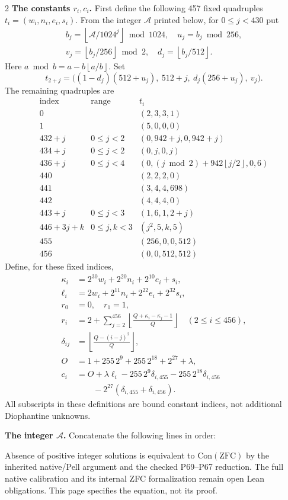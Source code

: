 \documentclass[10pt]{article}
\let\bigsum\sum
\renewcommand{\sum}{\bigsum\nolimits}
\newcommand{\fl}[1]{\left\lfloor #1\right\rfloor}
\begin{document}
\begin{multicols}{2}
\textbf{The constants $r_i,c_i$.}
First define the following 457 fixed quadruples
$t_i=(w_i,n_i,e_i,s_i)$.
From the integer $\mathcal A$ printed below, for $0\le j<430$ put
\[
\begin{gathered}
b_j=\fl{\mathcal A/1024^j}\bmod1024,\quad u_j=b_j\bmod256,\\
v_j=\fl{b_j/256}\bmod2,\quad d_j=\fl{b_j/512}.
\end{gathered}
\]
Here $a\bmod b=a-b\fl{a/b}$. Set
\[
t_{2+j}=\bigl((1-d_j)(512+u_j),\ 512+j,\ d_j(256+u_j),\ v_j\bigr).
\]
The remaining quadruples are
\[
\begin{array}{c|c|l}
\text{index}&\text{range}&t_i\\\hline
0&& (2,3,3,1)\\
1&& (5,0,0,0)\\
432+j&0\le j<2&(0,942+j,0,942+j)\\
434+j&0\le j<2&(0,j,0,j)\\
436+j&0\le j<4&(0,(j\bmod2)+942\fl{j/2},0,6)\\
440&&(2,2,2,0)\\
441&&(3,4,4,698)\\
442&&(4,4,4,0)\\
443+j&0\le j<3&(1,6,1,2+j)\\
446+3j+k&0\le j,k<3&(j^2,5,k,5)\\
455&&(256,0,0,512)\\
456&&(0,0,512,512)
\end{array}
\]
Define, for these fixed indices,
\begin{align*}
\kappa_i&=2^{30}w_i+2^{20}n_i+2^{10}e_i+s_i,\\
\ell_i&=2w_i+2^{11}n_i+2^{22}e_i+2^{32}s_i,\\
r_0&=0,\quad r_1=1,\\
r_i&=2+\sum_{j=2}^{456}\fl{\frac{Q+\kappa_i-\kappa_j-1}{Q}}
 \quad(2\le i\le456),\\
\delta_{ij}&=\fl{\frac{Q-(i-j)^2}{Q}},\\
O&=1+255\,2^9+255\,2^{18}+2^{27}+\lambda,\\
c_i&=O+\lambda\ell_i-255\,2^9\delta_{i,455}-255\,2^{18}\delta_{i,456}\\
 &\qquad -2^{27}(\delta_{i,455}+\delta_{i,456}).
\end{align*}
All subscripts in these definitions are bound constant indices, not
additional Diophantine unknowns.

\textbf{The integer $\mathcal A$.} Concatenate the following lines in order:
\begingroup
\fontsize{8}{9.1}\selectfont\ttfamily

\endgroup
\medskip
\normalfont\footnotesize
Absence of positive integer solutions is equivalent to $\mathrm{Con}(\mathrm{ZFC})$
by the inherited native/Pell argument and the checked P69--P67 reduction.
The full native calibration and its internal ZFC formalization remain open
Lean obligations. This page specifies the equation, not its proof.
\end{multicols}
\end{document}
